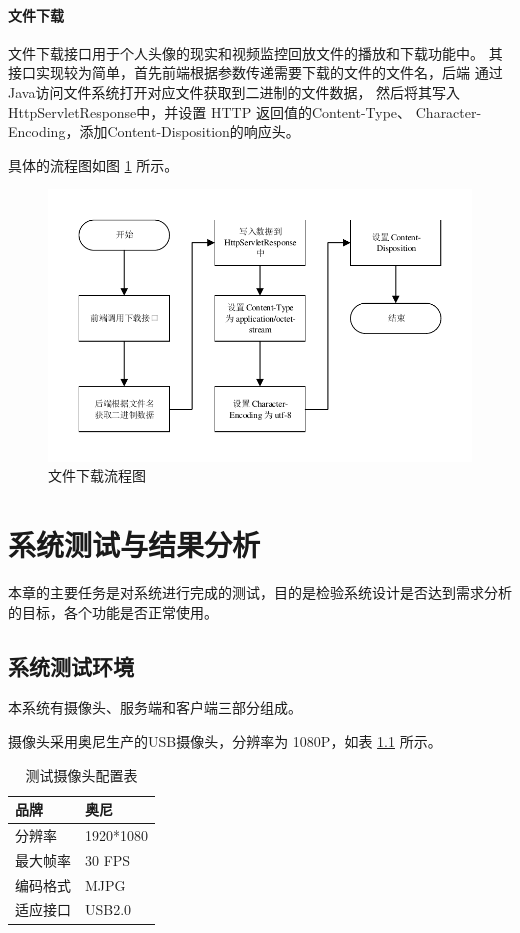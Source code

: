 \subsubsection{文件下载}
文件下载接口用于个人头像的现实和视频监控回放文件的播放和下载功能中。
其接口实现较为简单，首先前端根据参数传递需要下载的文件的文件名，后端
通过Java访问文件系统打开对应文件获取到二进制的文件数据，
然后将其写入HttpServletResponse中，并设置 HTTP 返回值的Content-Type、
Character-Encoding，添加Content-Disposition的响应头。

具体的流程图如图 \ref{Fig:seq_download} 所示。

\begin{figure}[ht]
    \centering
    \includegraphics[width=0.7\linewidth]{./Figure/IMG_seq_download.pdf}
    \caption{文件下载流程图}\label{Fig:seq_download}
\end{figure}

\chapter{系统测试与结果分析}
本章的主要任务是对系统进行完成的测试，目的是检验系统设计是否达到需求分析的目标，各个功能是否正常使用。

\section{系统测试环境}
本系统有摄像头、服务端和客户端三部分组成。

摄像头采用奥尼生产的USB摄像头，分辨率为 1080P，如表 \ref{Tab:cam} 所示。
\begin{longtable}[ht]{|l|l|}
    \caption{测试摄像头配置表}
    \label{Tab:cam}\\
    \hline
    品牌&奥尼\\
    \hline
    分辨率&1920*1080\\
    \hline
    最大帧率&30 FPS\\
    \hline
    编码格式&MJPG \\
    \hline
    适应接口&USB2.0\\
    \hline
    \end{longtable}

